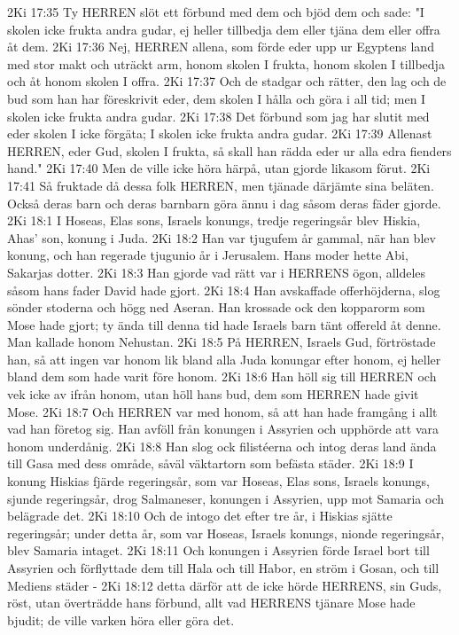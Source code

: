 2Ki 17:35  Ty HERREN slöt ett förbund med dem och bjöd dem och sade: "I skolen icke frukta andra gudar, ej heller tillbedja dem eller tjäna dem eller offra åt dem.
2Ki 17:36  Nej, HERREN allena, som förde eder upp ur Egyptens land med stor makt och uträckt arm, honom skolen I frukta, honom skolen I tillbedja och åt honom skolen I offra.
2Ki 17:37  Och de stadgar och rätter, den lag och de bud som han har föreskrivit eder, dem skolen I hålla och göra i all tid; men I skolen icke frukta andra gudar.
2Ki 17:38  Det förbund som jag har slutit med eder skolen I icke förgäta; I skolen icke frukta andra gudar.
2Ki 17:39  Allenast HERREN, eder Gud, skolen I frukta, så skall han rädda eder ur alla edra fienders hand."
2Ki 17:40  Men de ville icke höra härpå, utan gjorde likasom förut.
2Ki 17:41  Så fruktade då dessa folk HERREN, men tjänade därjämte sina beläten. Också deras barn och deras barnbarn göra ännu i dag såsom deras fäder gjorde.
2Ki 18:1  I Hoseas, Elas sons, Israels konungs, tredje regeringsår blev Hiskia, Ahas' son, konung i Juda.
2Ki 18:2  Han var tjugufem år gammal, när han blev konung, och han regerade tjugunio år i Jerusalem. Hans moder hette Abi, Sakarjas dotter.
2Ki 18:3  Han gjorde vad rätt var i HERRENS ögon, alldeles såsom hans fader David hade gjort.
2Ki 18:4  Han avskaffade offerhöjderna, slog sönder stoderna och högg ned Aseran. Han krossade ock den kopparorm som Mose hade gjort; ty ända till denna tid hade Israels barn tänt offereld åt denne. Man kallade honom Nehustan.
2Ki 18:5  På HERREN, Israels Gud, förtröstade han, så att ingen var honom lik bland alla Juda konungar efter honom, ej heller bland dem som hade varit före honom.
2Ki 18:6  Han höll sig till HERREN och vek icke av ifrån honom, utan höll hans bud, dem som HERREN hade givit Mose.
2Ki 18:7  Och HERREN var med honom, så att han hade framgång i allt vad han företog sig. Han avföll från konungen i Assyrien och upphörde att vara honom underdånig.
2Ki 18:8  Han slog ock filistéerna och intog deras land ända till Gasa med dess område, såväl väktartorn som befästa städer.
2Ki 18:9  I konung Hiskias fjärde regeringsår, som var Hoseas, Elas sons, Israels konungs, sjunde regeringsår, drog Salmaneser, konungen i Assyrien, upp mot Samaria och belägrade det.
2Ki 18:10  Och de intogo det efter tre år, i Hiskias sjätte regeringsår; under detta år, som var Hoseas, Israels konungs, nionde regeringsår, blev Samaria intaget.
2Ki 18:11  Och konungen i Assyrien förde Israel bort till Assyrien och förflyttade dem till Hala och till Habor, en ström i Gosan, och till Mediens städer -
2Ki 18:12  detta därför att de icke hörde HERRENS, sin Guds, röst, utan överträdde hans förbund, allt vad HERRENS tjänare Mose hade bjudit; de ville varken höra eller göra det.
